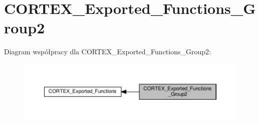 \hypertarget{group___c_o_r_t_e_x___exported___functions___group2}{}\section{C\+O\+R\+T\+E\+X\+\_\+\+Exported\+\_\+\+Functions\+\_\+\+Group2}
\label{group___c_o_r_t_e_x___exported___functions___group2}
Diagram współpracy dla C\+O\+R\+T\+E\+X\+\_\+\+Exported\+\_\+\+Functions\+\_\+\+Group2\+:\nopagebreak
\begin{figure}[H]
\begin{center}
\leavevmode
\includegraphics[width=350pt]{group___c_o_r_t_e_x___exported___functions___group2}
\end{center}
\end{figure}
